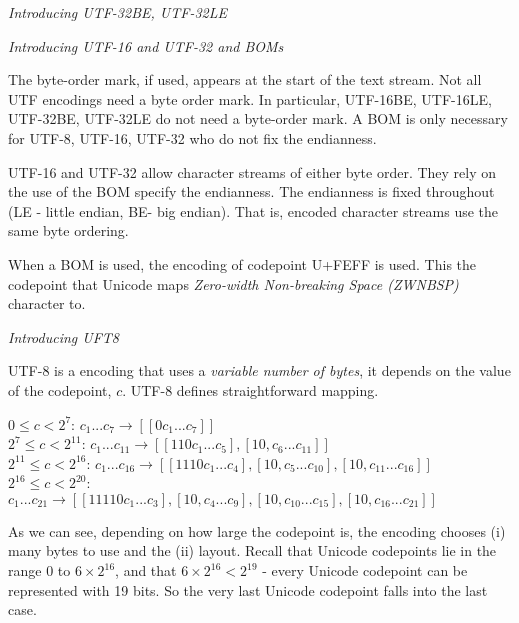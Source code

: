 \frmrule 

\textit{Introducing UTF-32BE, UTF-32LE}


\frmrule 


\textit{Introducing UTF-16 and UTF-32 and BOMs}





The byte-order mark, if used, appears at the start of the text stream. Not all UTF encodings need a 
byte order mark. In particular, UTF-16BE, UTF-16LE, UTF-32BE, UTF-32LE do not need 
a byte-order mark. A BOM is only necessary for UTF-8, UTF-16, UTF-32 who do not fix the endianness.


UTF-16 and UTF-32 allow character streams of either byte order.  
They rely on the use of the BOM specify the endianness.
The endianness is fixed throughout (LE - little endian, BE- big endian).
That is, encoded character streams use the same byte ordering. 

When a BOM is used, the encoding of codepoint U+FEFF is used. 
This the codepoint that Unicode maps \textit{Zero-width Non-breaking Space (ZWNBSP)} 
character to. 

\frmrule 

\textit{Introducing UFT8}

UTF-8 is a encoding that uses a \textit{variable number of bytes}, it depends 
on the value of the codepoint, $c$. UTF-8 defines straightforward mapping.

$0 \leqslant c < 2^7$:    $c_1 ... c_7 \rightarrow  [[0 c_1 ... c_7]]$\\
$2^7 \leqslant c < 2^{11}$: $c_1 ... c_{11} \rightarrow  [[110 c_1 ... c_5], [10, c_6 ... c_{11}]]$\\
$2^{11} \leqslant c < 2^{16}$: $c_1 ... c_{16} \rightarrow  [[1110 c_1 ... c_4], [10, c_5 ... c_{10}], [10, c_{11} ... c_{16}]]$\\
$2^{16} \leqslant c < 2^{20}$: $c_1 ... c_{21} \rightarrow  
[[11110 c_1 ... c_3], [10, c_4 ... c_9], [10, c_{10} ... c_{15}], [10, c_{16} ... c_{21}]]$

As we can see, depending on how large the codepoint is, 
the encoding chooses (i) many bytes to use and the (ii) layout. 
Recall that Unicode codepoints lie in the range $0$ to $6 \times 2^{16}$, and 
that $6 \times 2^{16} < 2^{19}$ - every Unicode codepoint can be represented with 19 bits. 
So the very last Unicode codepoint falls into the last case. 

